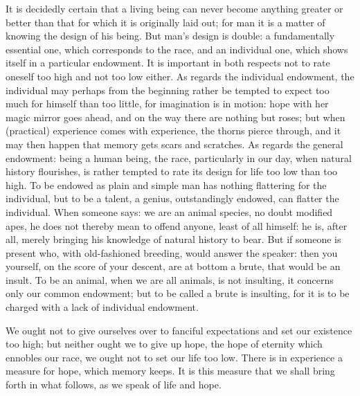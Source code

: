 \documentclass[12pt,a4paper,openany]{book}
\newcommand{\opage}[1]{\marginnote{\footnotesize\textit{[#1]}}}
\begin{document}
It is decidedly certain that a living being can never become anything greater or better than that
for which it is originally laid out; for man it is a matter of knowing the design of his being. But
man's design is double: a fundamentally essential one, which corresponds to the race, and an
individual one, which shows itself in a particular endowment. It is important in both respects not
to rate oneself too high and not too low either. As regards the individual endowment, the individual
may perhaps from the beginning rather be tempted to expect too much for himself than too little, for
imagination is in motion: hope with her magic mirror goes ahead, and on the way there are nothing but
roses; but when (practical) experience comes with experience, the thorns pierce through, and it may
then happen that memory gets scars and scratches. As regards the general endowment: being a human
being, the race, particularly in our day, when natural history flourishes, is rather tempted to
rate its design for life too low than too high. To be endowed as plain and simple man has nothing
flattering for the individual, but to be a talent, a genius, outstandingly endowed, can flatter the
individual. When someone says: we are an animal species, no doubt modified apes, he does not thereby
mean to offend anyone, least of all himself: he is, after all, merely bringing his knowledge of
natural history to bear. But if someone is present who, with old-fashioned breeding, would answer the
speaker: then you yourself, on the score of your descent, are at bottom a brute, that would be an
insult. To be an animal, when we are all animals,
\setcounter{footnote}{0}%
\opage{17}is not insulting, it concerns only our common endowment; but to be called a brute is
insulting, for it is to be charged with a lack of individual endowment.

We ought not to give ourselves over to fanciful expectations and set our existence too high; but
neither ought we to give up hope, the hope of eternity which ennobles our race, we ought not to set
our life too low. There is in experience a measure for hope, which memory keeps. It is this measure
that we shall bring forth in what follows, as we speak of life and hope.
\end{document}
